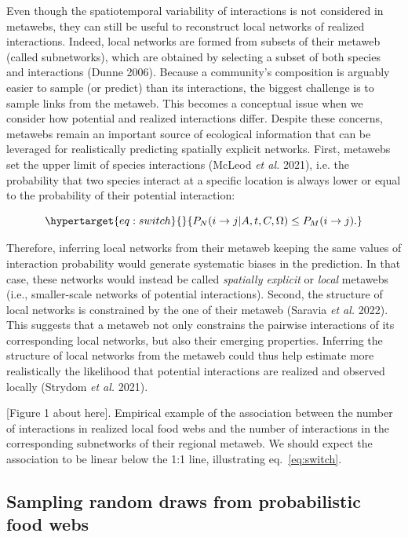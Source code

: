 \documentclass[10pt,oneside]{article}
\begin{document}
Even though the spatiotemporal variability of interactions is not
considered in metawebs, they can still be useful to reconstruct local
networks of realized interactions. Indeed, local networks are formed
from subsets of their metaweb (called subnetworks), which are obtained
by selecting a subset of both species and interactions (Dunne 2006).
Because a community's composition is arguably easier to sample (or
predict) than its interactions, the biggest challenge is to sample links
from the metaweb. This becomes a conceptual issue when we consider how
potential and realized interactions differ. Despite these concerns,
metawebs remain an important source of ecological information that can
be leveraged for realistically predicting spatially explicit networks.
First, metawebs set the upper limit of species interactions (McLeod
\emph{et al.} 2021), i.e. the probability that two species interact at a
specific location is always lower or equal to the probability of their
potential interaction:

\begin{equation}\protect\hypertarget{eq:switch}{}{P_{N}(i \rightarrow j | A, t, C, \Omega) \le
P_M(i \rightarrow j).}\label{eq:switch}\end{equation}

Therefore, inferring local networks from their metaweb keeping the same
values of interaction probability would generate systematic biases in
the prediction. In that case, these networks would instead be called
\emph{spatially explicit} or \emph{local} metawebs (i.e., smaller-scale
networks of potential interactions). Second, the structure of local
networks is constrained by the one of their metaweb (Saravia \emph{et
al.} 2022). This suggests that a metaweb not only constrains the
pairwise interactions of its corresponding local networks, but also
their emerging properties. Inferring the structure of local networks
from the metaweb could thus help estimate more realistically the
likelihood that potential interactions are realized and observed locally
(Strydom \emph{et al.} 2021).

{[}Figure 1 about here{]}. Empirical example of the association between
the number of interactions in realized local food webs and the number of
interactions in the corresponding subnetworks of their regional metaweb.
We should expect the association to be linear below the 1:1 line,
illustrating eq.~\ref{eq:switch}.

\hypertarget{sampling-random-draws-from-probabilistic-food-webs}{%
\subsection{Sampling random draws from probabilistic food
webs}\label{sampling-random-draws-from-probabilistic-food-webs}}
\end{document}
